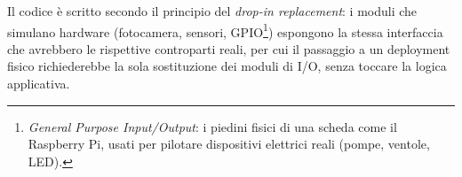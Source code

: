 Il codice è scritto secondo il principio del \emph{drop-in replacement}: i
moduli che simulano hardware (fotocamera, sensori, GPIO\footnote{\emph{General
Purpose Input/Output}: i piedini fisici di una scheda come il Raspberry Pi,
usati per pilotare dispositivi elettrici reali (pompe, ventole, LED).})
espongono la stessa interfaccia che avrebbero le rispettive controparti
reali, per cui il passaggio a un deployment fisico richiederebbe la sola
sostituzione dei moduli di I/O, senza toccare la logica applicativa.
